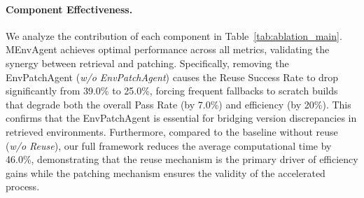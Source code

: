 \documentclass{article}
\theoremstyle{plain}
\theoremstyle{definition}
\theoremstyle{remark}
\begin{document}




\paragraph{Component Effectiveness.}
We analyze the contribution of each component in Table~\ref{tab:ablation_main}. MEnvAgent achieves optimal performance across all metrics, validating the synergy between retrieval and patching. Specifically, removing the EnvPatchAgent (\textit{w/o EnvPatchAgent}) causes the Reuse Success Rate to drop significantly from 39.0\% to 25.0\%, forcing frequent fallbacks to scratch builds that degrade both the overall Pass Rate (by 7.0\%) and efficiency (by 20\%). This confirms that the EnvPatchAgent is essential for bridging version discrepancies in retrieved environments. Furthermore, compared to the baseline without reuse (\textit{w/o Reuse}), our full framework reduces the average computational time by 46.0\%, demonstrating that the reuse mechanism is the primary driver of efficiency gains while the patching mechanism ensures the validity of the accelerated process.

\begin{table}[h]
    \centering
    \caption{Ablation results on component effectiveness (conducted with 10 instances per repository). \textbf{RSR} denotes the Reuse Success Rate.}
    \label{tab:ablation_main}
\end{table}


\end{document}

